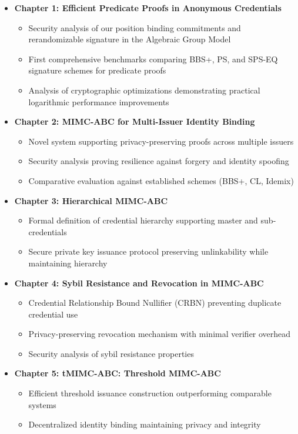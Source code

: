 \begin{itemize}
    \item \textbf{Chapter 1: Efficient Predicate Proofs in Anonymous Credentials}
    \begin{itemize}
        \item Security analysis of our position binding commitments and rerandomizable signature in the Algebraic Group Model
        \item First comprehensive benchmarks comparing BBS+, PS, and SPS-EQ signature schemes for predicate proofs
        \item Analysis of cryptographic optimizations demonstrating practical logarithmic performance improvements
    \end{itemize}

    \item \textbf{Chapter 2: MIMC-ABC for Multi-Issuer Identity Binding}
    \begin{itemize}
        \item Novel system supporting privacy-preserving proofs across multiple issuers
        \item Security analysis proving resilience against forgery and identity spoofing
        \item Comparative evaluation against established schemes (BBS+, CL, Idemix)
    \end{itemize}

    \item \textbf{Chapter 3: Hierarchical MIMC-ABC}
    \begin{itemize}
        \item Formal definition of credential hierarchy supporting master and sub-credentials
        \item Secure private key issuance protocol preserving unlinkability while maintaining hierarchy
    \end{itemize}

    \item \textbf{Chapter 4: Sybil Resistance and Revocation in MIMC-ABC}
    \begin{itemize}
        \item Credential Relationship Bound Nullifier (CRBN) preventing duplicate credential use
        \item Privacy-preserving revocation mechanism with minimal verifier overhead
        \item Security analysis of sybil resistance properties
    \end{itemize}

    \item \textbf{Chapter 5: tMIMC-ABC: Threshold MIMC-ABC}
    \begin{itemize}
        \item Efficient threshold issuance construction outperforming comparable systems
        \item Decentralized identity binding maintaining privacy and integrity
    \end{itemize}
\end{itemize}

